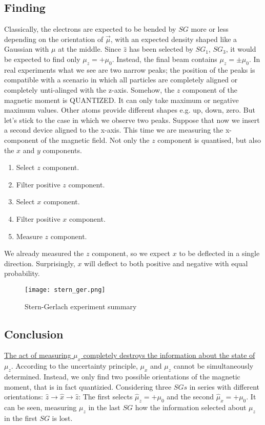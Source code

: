   \subsection{Finding}
  Classically, the electrons are expected to be bended by $SG$ more or less depending on the orientation of $\vec{\mu}$, with an expected density shaped like a Gaussian with $\mu$ at the middle.
  Since $\hat{z}$ has been selected by $SG_1$, $SG_3$, it would be expected to find only $\mu_z = + \mu_0$. Instead, the final beam contains $\mu_z =\pm \mu_0$.
  In real experiments what we see are two narrow peaks; the position of the peaks is compatible with a scenario in which all particles are completely aligned or completely unti-alinged with the z-axis.
  Somehow, the $z$ component of the magnetic moment is QUANTIZED.
  It can only take maximum or negative maximum values.
  Other atoms provide different shapes e.g. up, down, zero.
  But let’s stick to the case in which we observe two peaks.
  Suppose that now we insert a second device aligned to the x-axis.
  This time we are measuring the x-component of the magnetic field.
  Not only the $z$ component is quantised, but also the $x$ and $y$ components.

  \begin{multicols}{2}
    \begin{enumerate}
      \item Select $z$ component.
      \item Filter positive $z$ component.
      \item Select $x$ component.
      \item Filter positive $x$ component.
      \item Measure $z$ component.
    \end{enumerate}
  \end{multicols}

  We already measured the $z$ component, so we expect $x$ to be deflected in a single direction. Surprisingly, $x$ will deflect to both positive and negative with equal probability.

\begin{figure}[h!]
    \centering
    \texttt{[image: stern\_ger.png]}
    \caption{\label{fig:stern_ger} Stern-Gerlach experiment summary}
\end{figure}
  \subsection{Conclusion}
  \underline{The act of measuring $\mu_x$ completely destroys the information about the state of $\mu_z$}.
  According to the uncertainty principle, $\mu_x$ and $\mu_z$ cannot be simultaneously determined.
  Instead, we only find two possible orientations of the magnetic moment, that is in fact quantizied.
  Considering three $SGs$ in series with different orientations: $\hat{z}\rightarrow\hat{x}\rightarrow\hat{z}$:
  The first selects $\hat{\mu}_z = +\mu_0$ and the second $\hat{\mu}_x = +\mu_0$.
  It can be seen, measuring $\mu_z$ in the last $SG$ how the information selected about $\mu_z$ in the first $SG$ is lost.

